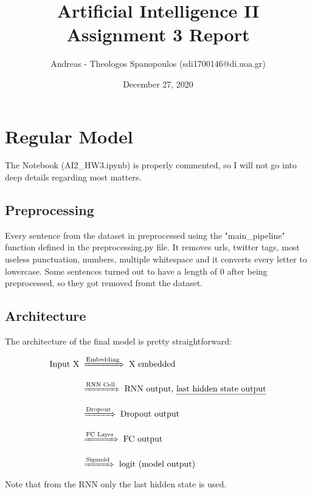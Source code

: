 \documentclass[12pt]{report}
\title{Artificial Intelligence II \\ Assignment 3 Report}
\author{Andreas - Theologos Spanopoulos (sdi1700146@di.uoa.gr)}
\date{December 27, 2020}
\begin{document}
\maketitle

\section*{Regular Model}
The Notebook (AI2\_HW3.ipynb) is properly commented, so I will not go into deep
details regarding most matters.
\bigskip

\subsection*{Preprocessing}
Every sentence from the dataset in preprocessed using the "main\_pipeline" function defined in
the preprocessing.py file. It removes urls, twitter tags, most useless punctuation, numbers,
multiple whitespace and it converts every letter to lowercase. Some sentences turned out to have
a length of 0 after being preprocessed, so they got removed fromt the dataset.
\bigskip

\subsection*{Architecture}
The architecture of the final model is pretty straightforward:

\begin{align*}
    \text{Input X} &\;\xRightarrow[]{\text{Embedding}}\; \text{X embedded} \\[1.5ex]
                   &\;\xRightarrow[]{\text{RNN Cell}}\; \text{RNN output,
                                                    \underline{last hidden state output}} \\[1.5ex]
                   &\;\xRightarrow[]{\text{Dropout}}\; \text{Dropout output} \\[1.5ex]
                   &\;\xRightarrow[]{\text{FC Layer}}\; \text{FC output} \\[1.5ex]
                   &\;\xRightarrow[]{\text{Sigmoid}}\; \text{logit (model output)}
\end{align*}
Note that from the RNN only the last hidden state is used.
\clearpage
\end{document}
